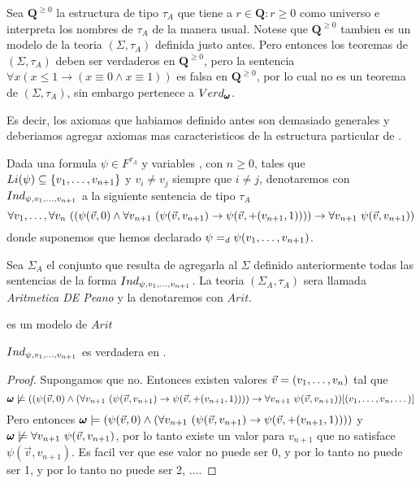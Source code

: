   \begin{remark}
    
  Sea $\mathbf{Q}^{\geq 0}$ la estructura de tipo $\tau_A$ que tiene a ${r\in\mathbf{Q}:r\geq0}$ como universo e interpreta
  los nombres de $\tau_A$ de la manera usual. Notese que $\mathbf{Q}^{\geq 0}$ tambien es un modelo de la teoria $(\Sigma, \tau_A)$ definida justo antes.
  Pero entonces los teoremas de $(\Sigma,\tau_A)$ deben ser verdaderos en $\mathbf{Q}^{\geq 0}$, pero la sentencia 
  $\forall x (x\leq1\rightarrow (x\equiv0\land x\equiv1))$ es falsa en $\mathbf{Q}^{\geq 0}$, por lo cual no es 
  un teorema de $(\Sigma,\tau_A)$, sin embargo pertenece a $Verd_{\pmb{\omega}}$.
  
  Es decir, los axiomas que habiamos definido antes son demasiado generales y deberiamos agregar axiomas mas caracteristicos de la estructura
  particular de \pomega.
  \end{remark}

  \begin{definition}
    Dada una formula $\psi\in F^{\tau_A}$ y variables , con $n\geq0$, tales que $Li(\psi)\subseteq\{v_{1}, \dots, v_{n+1}\}$ y $v_i\neq v_j$ siempre que $i\neq j$,
    denotaremos con $Ind_{\psi,v_{1}, \dots, v_{n+1}}$ a la siguiente sentencia de tipo $\tau_A$
    $$
    \succession{\forall v}{1}{n}\ ((\psi(\vec{v},0)\land\forall v_{n+1}\ (\psi(\vec{v},v_{n+1})\rightarrow\psi(\vec{v},+(v_{n+1},1))))\rightarrow\forall v_{n+1}\ \psi(\vec{v},v_{n+1}))
    $$
    donde suponemos que hemos declarado $\psi=_d\psi(v_{1}, \dots, v_{n+1})$.

    Sea $\Sigma_A$ el conjunto que resulta de agregarla al $\Sigma$ definido anteriormente todas las sentencias de la forma $Ind_{\psi,v_{1}, \dots, v_{n+1}}$.
    La teoria $(\Sigma_A,\tau_A)$ sera llamada \emph{Aritmetica DE Peano} y la denotaremos con $Arit$.
  \end{definition}

  \begin{lemma}
    \pomega es un modelo de $Arit$
  \end{lemma}

  \begin{remark}
    $Ind_{\psi,v_{1}, \dots, v_{n+1}}$ es verdadera en \pomega.
    \begin{proof}
       Supongamos que no. Entonces existen valores $\vec{v}=(v_{1}, \dots, v_{n})$ tal que 
       $$
       \pmb{\omega}\not\models ((\psi(\vec{v},0)\land(\forall v_{n+1}\ (\psi(\vec{v}, v_{n+1})\rightarrow\psi(\vec{v},+(v_{n+1},1))))\rightarrow\forall v_{n+1}\ \psi(\vec{v},v_{n+1}))[(v_{1}, \dots, v_{n},\dots)]
       $$
       Pero entonces $\pmb{\omega}\models(\psi(\vec{v},0)\land(\forall v_{n+1}\ (\psi(\vec{v}, v_{n+1})\rightarrow\psi(\vec{v},+(v_{n+1},1))))$ y 
       $\pomega\not\models\forall v_{n+1}\ \psi(\vec{v},v_{n+1})$, por lo tanto existe un valor para $v_{n+1}$ que no satisface $\psi(\vec{v},v_{n+1})$.
       Es facil ver que ese valor no puede ser 0, y por lo tanto no puede ser 1, y por lo tanto no puede ser 2, $\dots$. \abs
      
      \end{proof}
  \end{remark}

